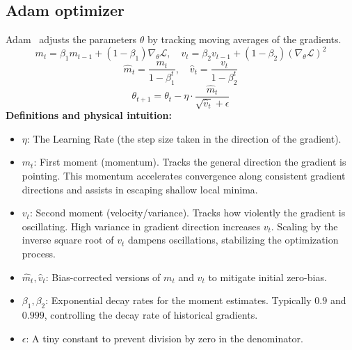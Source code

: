\documentclass[11pt]{article}
\begin{document}
	\subsection{Adam optimizer}
	Adam~\cite{kingma2014adam} adjusts the parameters $\theta$ by tracking moving averages of the gradients.
	\begin{equation}
		m_t = \beta_1 m_{t-1} + (1 - \beta_1) \nabla_\theta \mathcal{L}, \quad v_t = \beta_2 v_{t-1} + (1 - \beta_2) (\nabla_\theta \mathcal{L})^2
	\end{equation}
	\begin{equation}
		\hat{m}_t = \frac{m_t}{1 - \beta_1^t}, \quad \hat{v}_t = \frac{v_t}{1 - \beta_2^t}
	\end{equation}
	\begin{equation}
		\theta_{t+1} = \theta_t - \eta \cdot \frac{\hat{m}_t}{\sqrt{\hat{v}_t} + \epsilon}
	\end{equation}
	\textbf{Definitions and physical intuition:}
	\begin{itemize}
		\item $\eta$: The Learning Rate (the step size taken in the direction of the gradient).
		\item $m_t$: First moment (momentum). Tracks the general direction the gradient is pointing.
		This momentum accelerates convergence along consistent gradient directions and assists in escaping shallow local minima.
		\item $v_t$: Second moment (velocity/variance). Tracks how violently the gradient is oscillating.
		High variance in gradient direction increases $v_t$. Scaling by the inverse square root of $v_t$ dampens oscillations, stabilizing the optimization process.
		\item $\hat{m}_t, \hat{v}_t$: Bias-corrected versions of $m_t$ and $v_t$ to mitigate initial zero-bias.
		\item $\beta_1, \beta_2$: Exponential decay rates for the moment estimates.
		Typically $0.9$ and $0.999$, controlling the decay rate of historical gradients.
		\item $\epsilon$: A tiny constant to prevent division by zero in the denominator.
	\end{itemize}
	
\end{document}
